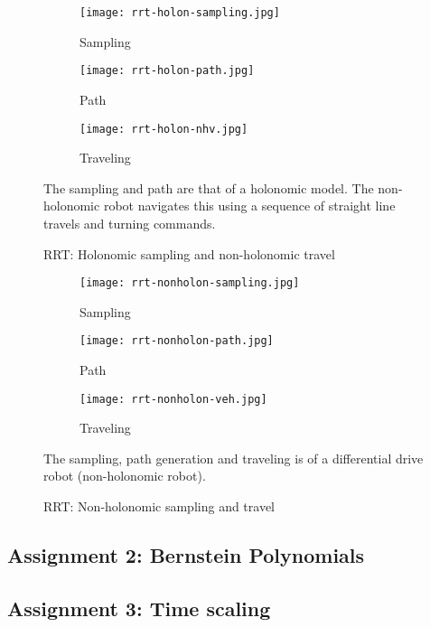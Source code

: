 \begin{figure}[ht]
    \centering
    \begin{subfigure}[b]{0.3\textwidth}
        \texttt{[image: rrt-holon-sampling.jpg]}
        \caption{Sampling}
    \end{subfigure}
    \begin{subfigure}[b]{0.3\textwidth}
        \texttt{[image: rrt-holon-path.jpg]}
        \caption{Path}
    \end{subfigure}
    \begin{subfigure}[b]{0.3\textwidth}
        \texttt{[image: rrt-holon-nhv.jpg]}
        \caption{Traveling}
    \end{subfigure}
    \caption{RRT: Holonomic sampling and non-holonomic travel}
    \label{fig:rrt-holo}
    \small
        The sampling and path are that of a holonomic model. The non-holonomic robot navigates this using a sequence of straight line travels and turning commands.
\end{figure}

\begin{figure}[ht]
    \centering
    \begin{subfigure}[b]{0.3\textwidth}
        \texttt{[image: rrt-nonholon-sampling.jpg]}
        \caption{Sampling}
    \end{subfigure}
    \begin{subfigure}[b]{0.3\textwidth}
        \texttt{[image: rrt-nonholon-path.jpg]}
        \caption{Path}
    \end{subfigure}
    \begin{subfigure}[b]{0.3\textwidth}
        \texttt{[image: rrt-nonholon-veh.jpg]}
        \caption{Traveling}
    \end{subfigure}
    \caption{RRT: Non-holonomic sampling and travel}
    \label{fig:rrt-nonholo}
    \small
        The sampling, path generation and traveling is of a differential drive robot (non-holonomic robot).
\end{figure}

\subsection{Assignment 2: Bernstein Polynomials}

\subsection{Assignment 3: Time scaling}
